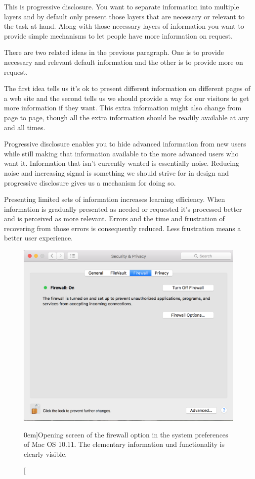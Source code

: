 This is progressive disclosure. You want to separate information into multiple layers and by default only present those layers that are necessary or relevant to the task at hand. Along with those necessary layers of information you want to provide simple mechanisms to let people have more information on request.

There are two related ideas in the previous paragraph. One is to provide necessary and relevant default information and the other is to provide more on request.

The first idea tells us it’s ok to present different information on different pages of a web site and the second tells us we should provide a way for our visitors to get more information if they want. This extra information might also change from page to page, though all the extra information should be readily available at any and all times.

Progressive disclosure enables you to hide advanced information from new users while still making that information available to the more advanced users who want it. Information that isn’t currently wanted is essentially noise. Reducing noise and increasing signal is something we should strive for in design and progressive disclosure gives us a mechanism for doing so.

Presenting limited sets of information increases learning efficiency. When information is gradually presented as needed or requested it’s processed better and is perceived as more relevant. Errors and the time and frustration of recovering from those errors is consequently reduced. Less frustration means a better user experience.

\begin{figure}%
  \includegraphics[width=1.0\textwidth]{../figures/firewall_start.png}
  \caption[][0em]{Opening screen of the firewall option in the system preferences of Mac OS 10.11. The elementary information und functionality is clearly visible.}
  \label{fig:firewall_start}
\end{figure}

